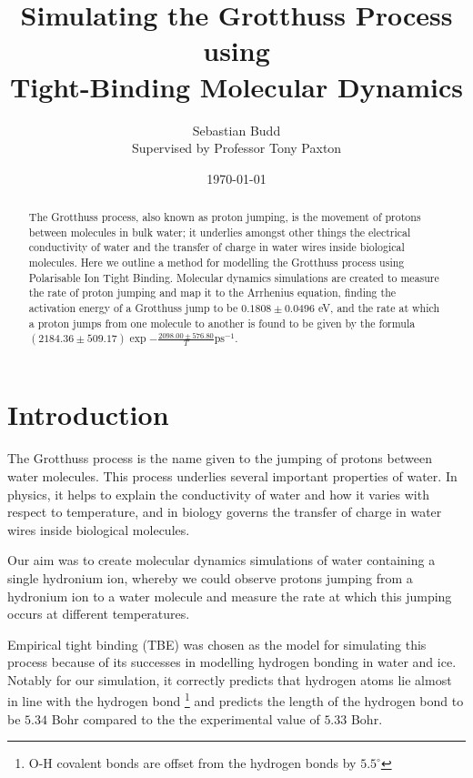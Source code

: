 \documentclass[reprint,]{revtex4-2}
\begin{document}

\title{Simulating the Grotthuss Process using\\Tight-Binding Molecular Dynamics}


\author{Sebastian Budd\\Supervised by Professor Tony Paxton}
\date{\today}
\begin{abstract}
The Grotthuss process, also known as proton jumping, is the movement of protons between molecules in bulk water; it underlies amongst other things the electrical conductivity of water and the transfer of charge in water wires inside biological molecules. Here we outline a method for modelling the Grotthuss process using Polarisable Ion Tight Binding. Molecular dynamics simulations are created to measure the rate of proton jumping and map it to the Arrhenius equation, finding the activation energy of a Grotthuss jump to be $0.1808 \pm 0.0496$ eV, and the rate at which a proton jumps from one molecule to another is found to be given by the formula $(2184.36 \pm 509.17)\exp{-\frac{2098.00 \pm 576.80}{T}} \text{ps}^{-1}$.
\end{abstract}

\maketitle

\section{Introduction}
The Grotthuss process is the name given to the jumping of protons between water molecules.\cite{Grotthuss1805} This process underlies several important properties of water. In physics, it helps to explain the conductivity of water and how it varies with respect to temperature, and in biology governs the transfer of charge in water wires inside biological molecules.\cite{pomes1996structure}

Our aim was to create molecular dynamics simulations of water containing a single hydronium ion, whereby we could observe protons jumping from a hydronium ion to a water molecule and measure the rate at which this jumping occurs at different temperatures.

Empirical tight binding (TBE) was chosen as the model for simulating this process because of its successes in modelling hydrogen bonding in water and ice.\cite{Lozovoi2014} Notably for our simulation, it correctly predicts that hydrogen atoms lie almost in line with the hydrogen bond \footnote{O-H covalent bonds are offset from the hydrogen bonds by $5.5^{\circ}$} and predicts the length of the hydrogen bond to be $5.34$ Bohr compared to the the experimental value of $5.33$ Bohr.\cite{Lozovoi2014}
\end{document}

